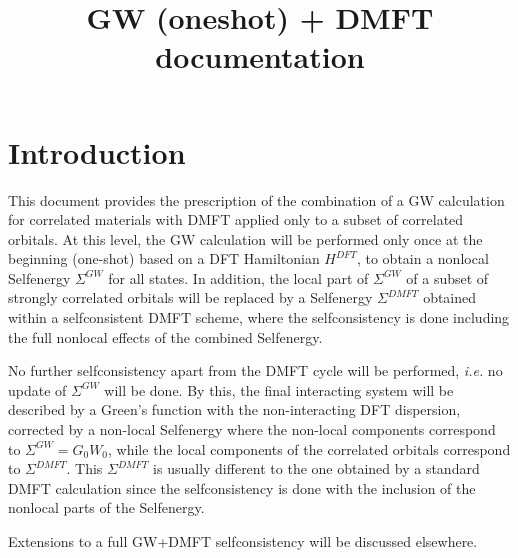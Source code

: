 \documentclass[12pt,a4paper]{scrartcl}
\title{GW (oneshot) + DMFT documentation}
\numberwithin{equation}{section}
\newcommand{\GF}{Green's function}
\begin{document}
\maketitle
\tableofcontents


\section{Introduction}

This document  provides the prescription of the combination of a GW calculation
for correlated materials with DMFT applied only to a subset of correlated orbitals.
At this level, the GW calculation will be performed only once at the beginning (one-shot)
based on a DFT Hamiltonian $H^{DFT}$,
to obtain a nonlocal Selfenergy $\Sigma^{GW}$ for all states. 
In addition, the local part of $\Sigma^{GW}$ of a subset of strongly correlated orbitals will be replaced by a Selfenergy $\Sigma^{DMFT}$
obtained within a selfconsistent DMFT scheme, 
where the selfconsistency is done including the full nonlocal
effects of the combined Selfenergy.

No further selfconsistency apart from the DMFT cycle will be performed, {\it i.e.} no update of $\Sigma^{GW}$ will be done. By this, the final interacting system will be
described by a {\GF} with the non-interacting DFT dispersion, corrected by a non-local Selfenergy where the non-local components
correspond to $\Sigma^{GW}=G_0W_0$, while the local components
of the correlated orbitals correspond to $\Sigma^{DMFT}$.
This $\Sigma^{DMFT}$ is usually different to the one obtained by
a standard DMFT calculation since the selfconsistency is
done with the inclusion of the nonlocal parts of the 
Selfenergy.

Extensions to a full GW+DMFT selfconsistency will be discussed elsewhere.
\end{document}
